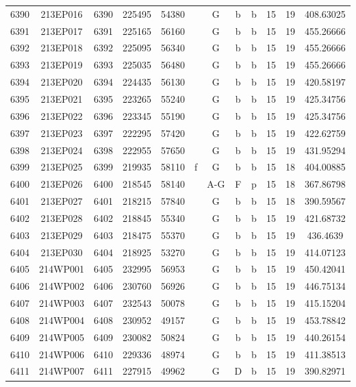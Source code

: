 \begin{tabular}{|*{12}{c|}}
6390 & 213EP016 & 6390 & 225495 & 54380 &  & G & b & b & 15 & 19 & 408.63025 \\ 
6391 & 213EP017 & 6391 & 225165 & 56160 &  & G & b & b & 15 & 19 & 455.26666 \\ 
6392 & 213EP018 & 6392 & 225095 & 56340 &  & G & b & b & 15 & 19 & 455.26666 \\ 
6393 & 213EP019 & 6393 & 225035 & 56480 &  & G & b & b & 15 & 19 & 455.26666 \\ 
6394 & 213EP020 & 6394 & 224435 & 56130 &  & G & b & b & 15 & 19 & 420.58197 \\ 
6395 & 213EP021 & 6395 & 223265 & 55240 &  & G & b & b & 15 & 19 & 425.34756 \\ 
6396 & 213EP022 & 6396 & 223345 & 55190 &  & G & b & b & 15 & 19 & 425.34756 \\ 
6397 & 213EP023 & 6397 & 222295 & 57420 &  & G & b & b & 15 & 19 & 422.62759 \\ 
6398 & 213EP024 & 6398 & 222955 & 57650 &  & G & b & b & 15 & 19 & 431.95294 \\ 
6399 & 213EP025 & 6399 & 219935 & 58110 & f & G & b & b & 15 & 18 & 404.00885 \\ 
6400 & 213EP026 & 6400 & 218545 & 58140 &  & A-G & F & p & 15 & 18 & 367.86798 \\ 
6401 & 213EP027 & 6401 & 218215 & 57840 &  & G & b & b & 15 & 18 & 390.59567 \\ 
6402 & 213EP028 & 6402 & 218845 & 55340 &  & G & b & b & 15 & 19 & 421.68732 \\ 
6403 & 213EP029 & 6403 & 218475 & 55370 &  & G & b & b & 15 & 19 & 436.4639 \\ 
6404 & 213EP030 & 6404 & 218925 & 53270 &  & G & b & b & 15 & 19 & 414.07123 \\ 
6405 & 214WP001 & 6405 & 232995 & 56953 &  & G & b & b & 15 & 19 & 450.42041 \\ 
6406 & 214WP002 & 6406 & 230760 & 56926 &  & G & b & b & 15 & 19 & 446.75134 \\ 
6407 & 214WP003 & 6407 & 232543 & 50078 &  & G & b & b & 15 & 19 & 415.15204 \\ 
6408 & 214WP004 & 6408 & 230952 & 49157 &  & G & b & b & 15 & 19 & 453.78842 \\ 
6409 & 214WP005 & 6409 & 230082 & 50824 &  & G & b & b & 15 & 19 & 440.26154 \\ 
6410 & 214WP006 & 6410 & 229336 & 48974 &  & G & b & b & 15 & 19 & 411.38513 \\ 
6411 & 214WP007 & 6411 & 227915 & 49962 &  & G & D & b & 15 & 19 & 390.82971 \\ 

\end{tabular}
